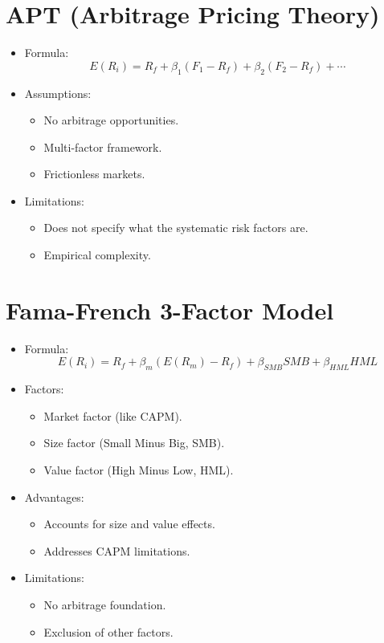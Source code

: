 \documentclass[twoside,openany]{book}
\begin{document}
\section*{APT (Arbitrage Pricing Theory)}
\begin{itemize}
    \item Formula:
    \[ E(R_i) = R_f + \beta_1 (F_1 - R_f) + \beta_2 (F_2 - R_f) + \cdots \]
    \item Assumptions:
    \begin{itemize}
        \item No arbitrage opportunities.
        \item Multi-factor framework.
        \item Frictionless markets.
    \end{itemize}
    \item Limitations:
    \begin{itemize}
        \item Does not specify what the systematic risk factors are.
        \item Empirical complexity.
    \end{itemize}
\end{itemize}
\section*{Fama-French 3-Factor Model}
\begin{itemize}
    \item Formula:
    \[ E(R_i) = R_f + \beta_m (E(R_m) - R_f) + \beta_{SMB} SMB + \beta_{HML} HML \]
    \item Factors:
    \begin{itemize}
        \item Market factor (like CAPM).
        \item Size factor (Small Minus Big, SMB).
        \item Value factor (High Minus Low, HML).
    \end{itemize}
    \item Advantages:
    \begin{itemize}
        \item Accounts for size and value effects.
        \item Addresses CAPM limitations.
    \end{itemize}
    \item Limitations:
    \begin{itemize}
        \item No arbitrage foundation.
        \item Exclusion of other factors.
    \end{itemize}
\end{itemize}
\end{document}

